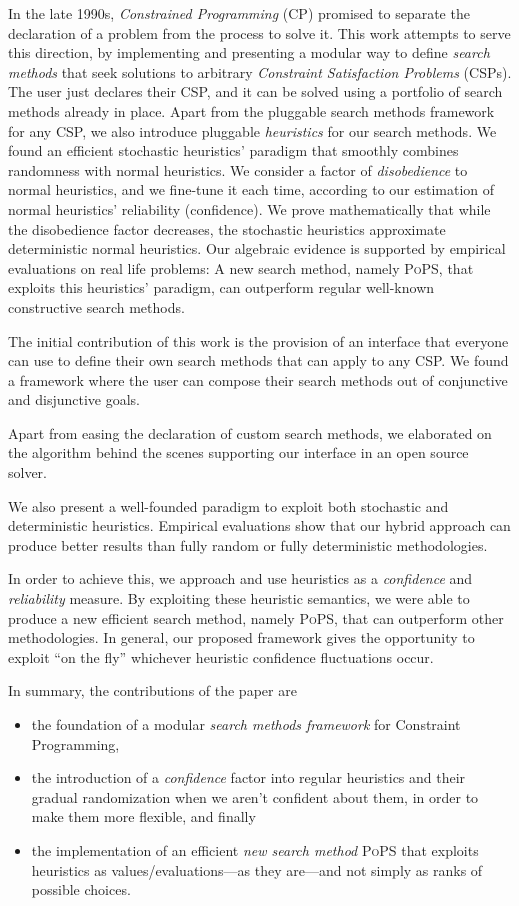 \documentclass[a4paper]{article}
\begin{document}
In the late 1990s, \emph{Constrained Programming} (CP)
promised to separate the declaration of a problem from the
process to solve it. This work attempts to serve this
direction, by implementing and presenting a modular way to
define \emph{search methods} that seek solutions to
arbitrary \emph{Constraint Satisfaction Problems} (CSPs).
The user just declares their CSP, and it can be solved using
a portfolio of search methods already in place. Apart from
the pluggable search methods framework for any CSP, we also
introduce pluggable \emph{heuristics} for our search
methods. We found an efficient stochastic heuristics'
paradigm that smoothly combines randomness with normal
heuristics. We consider a factor of \emph{disobedience} to
normal heuristics, and we fine-tune it each time, according
to our estimation of normal heuristics' reliability
(confidence). We prove mathematically that while the
disobedience factor decreases, the stochastic heuristics
approximate deterministic normal heuristics. Our algebraic
evidence is supported by empirical evaluations on real life
problems: A new search method, namely \textsc{PoPS}, that
exploits this heuristics' paradigm, can outperform regular
well-known constructive search methods.

The initial contribution of this work is the provision of an
interface that everyone can use to define their own search
methods that can apply to any CSP. We found a framework
where the user can compose their search methods out of
conjunctive and disjunctive goals.

Apart from easing the declaration of custom search methods,
we elaborated on the algorithm behind the scenes supporting
our interface in an open source solver.

We also present a well-founded paradigm to exploit both
stochastic and deterministic heuristics. Empirical
evaluations show that our hybrid approach can produce better
results than fully random or fully deterministic
methodologies.

In order to achieve this, we approach and use heuristics as
a \emph{confidence} and \emph{reliability} measure. By
exploiting these heuristic semantics, we were able to
produce a new efficient search method, namely \textsc{PoPS},
that can outperform other methodologies. In general, our
proposed framework gives the opportunity to exploit ``on the
fly'' whichever heuristic confidence fluctuations occur.

In summary, the contributions of the paper are
\begin{itemize}
  \item the foundation of a modular \emph{search methods
        framework} for Constraint Programming,
  \item the introduction of a \emph{confidence} factor into
        regular heuristics and their gradual randomization
        when we aren't confident about them, in order to
        make them more flexible, and finally
  \item the implementation of an efficient \emph{new search
        method} \textsc{PoPS} that exploits heuristics as
        values\slash evaluations---as they are---and not
        simply as ranks of possible choices.
\end{itemize}
\end{document}

